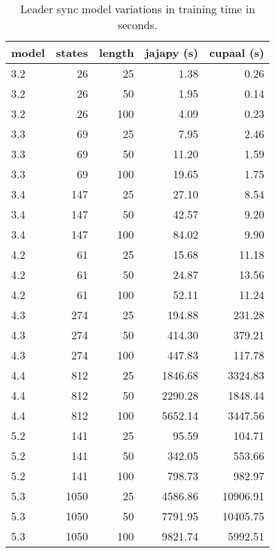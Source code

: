 \begin{table}
    \centering
    \caption{Leader sync model variations in training time in seconds.}
    \label{tab:leader_results}
    \begin{tabular}{lrrrr}
        \toprule
        model & states & length & jajapy (s) & cupaal (s) \\
        \midrule
        3.2   & 26     & 25     & 1.38       & 0.26       \\
        3.2   & 26     & 50     & 1.95       & 0.14       \\
        3.2   & 26     & 100    & 4.09       & 0.23       \\
        3.3   & 69     & 25     & 7.95       & 2.46       \\
        3.3   & 69     & 50     & 11.20      & 1.59       \\
        3.3   & 69     & 100    & 19.65      & 1.75       \\
        3.4   & 147    & 25     & 27.10      & 8.54       \\
        3.4   & 147    & 50     & 42.57      & 9.20       \\
        3.4   & 147    & 100    & 84.02      & 9.90       \\
        4.2   & 61     & 25     & 15.68      & 11.18      \\
        4.2   & 61     & 50     & 24.87      & 13.56      \\
        4.2   & 61     & 100    & 52.11      & 11.24      \\
        4.3   & 274    & 25     & 194.88     & 231.28     \\
        4.3   & 274    & 50     & 414.30     & 379.21     \\
        4.3   & 274    & 100    & 447.83     & 117.78     \\
        4.4   & 812    & 25     & 1846.68    & 3324.83    \\
        4.4   & 812    & 50     & 2290.28    & 1848.44    \\
        4.4   & 812    & 100    & 5652.14    & 3447.56    \\
        5.2   & 141    & 25     & 95.59      & 104.71     \\
        5.2   & 141    & 50     & 342.05     & 553.66     \\
        5.2   & 141    & 100    & 798.73     & 982.97     \\
        5.3   & 1050   & 25     & 4586.86    & 10906.91   \\
        5.3   & 1050   & 50     & 7791.95    & 10405.75   \\
        5.3   & 1050   & 100    & 9821.74    & 5992.51    \\
        \bottomrule
    \end{tabular}
\end{table}


